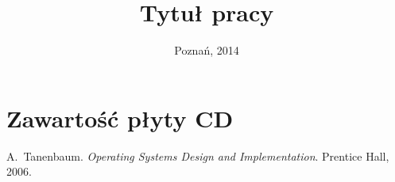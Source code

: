 \documentclass[11pt,a4paper,polish,thesis]{dcsbook}
\begin{document}
\author{}
\title{Tytuł pracy}
\date{Poznań, 2014}
\maketitle
\frontmatter
\tableofcontents{}
\mainmatter










\appendix

\chapter{Zawartość płyty CD}

\backmatter

\begin{thebibliography}{1}
A.~Tanenbaum. \emph{Operating Systems Design and Implementation}.
Prentice Hall, 2006.
\end{thebibliography}
\end{document}

